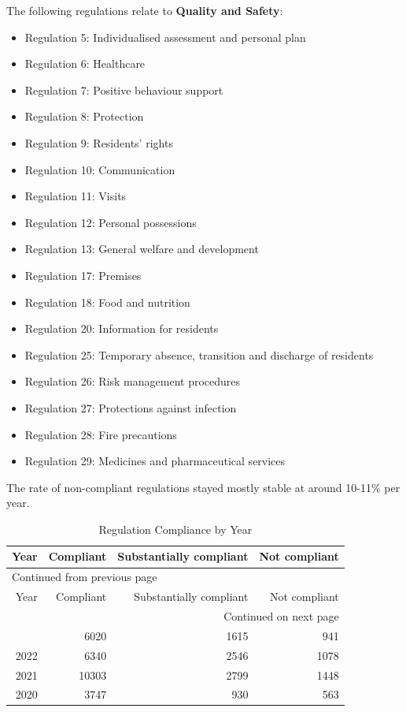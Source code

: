 \documentclass[a4paper,11pt,twoside]{article}
\begin{document}
The following regulations relate to \textbf{Quality and Safety}:

\begin{itemize}
\item Regulation 5: Individualised assessment and personal plan
\item Regulation 6: Healthcare
\item Regulation 7: Positive behaviour support
\item Regulation 8: Protection
\item Regulation 9: Residents' rights
\item Regulation 10: Communication
\item Regulation 11: Visits
\item Regulation 12: Personal possessions
\item Regulation 13: General welfare and development
\item Regulation 17: Premises
\item Regulation 18: Food and nutrition
\item Regulation 20: Information for residents
\item Regulation 25: Temporary absence, transition and discharge of residents
\item Regulation 26: Risk management procedures
\item Regulation 27: Protections against infection
\item Regulation 28: Fire precautions
\item Regulation 29: Medicines and pharmaceutical services
\end{itemize}

The rate of non-compliant regulations stayed mostly stable at around 10-11\% per year.

\begin{longtable}{rrrr}
\caption{Regulation Compliance by Year}
\\[0pt]
Year & Compliant & Substantially compliant & Not compliant\\[0pt]
\hline
\endfirsthead
\multicolumn{4}{l}{Continued from previous page} \\[0pt]
\hline

Year & Compliant & Substantially compliant & Not compliant \\[0pt]

\hline
\endhead
\hline\multicolumn{4}{r}{Continued on next page} \\
\endfoot
\endlastfoot
\hline
2023 & 6020 & 1615 & 941\\[0pt]
2022 & 6340 & 2546 & 1078\\[0pt]
2021 & 10303 & 2799 & 1448\\[0pt]
2020 & 3747 & 930 & 563\\[0pt]
\end{longtable}
\end{document}
